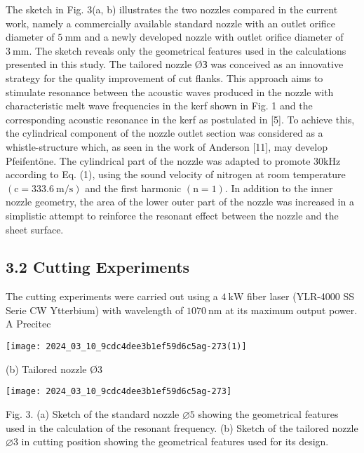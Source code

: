 \documentclass[10pt]{article}
\begin{document}
The sketch in Fig. 3(a, b) illustrates the two nozzles compared in the current work, namely a commercially available standard nozzle with an outlet orifice diameter of $5 \mathrm{~mm}$ and a newly developed nozzle with outlet orifice diameter of $3 \mathrm{~mm}$. The sketch reveals only the geometrical features used in the calculations presented in this study. The tailored nozzle ØЗ was conceived as an innovative strategy for the quality improvement of cut flanks. This approach aims to stimulate resonance between the acoustic waves produced in the nozzle with characteristic melt wave frequencies in the kerf shown in Fig. 1 and the corresponding acoustic resonance in the kerf as postulated in [5]. To achieve this, the cylindrical component of the nozzle outlet section was considered as a whistle-structure which, as seen in the work of Anderson [11], may develop Pfeifentöne. The cylindrical part of the nozzle was adapted to promote $30 \mathrm{kHz}$ according to Eq. (1), using the sound velocity of nitrogen at room temperature $(\mathrm{c}=333.6 \mathrm{~m} / \mathrm{s})$ and the first harmonic $(\mathrm{n}=1)$. In addition to the inner nozzle geometry, the area of the lower outer part of the nozzle was increased in a simplistic attempt to reinforce the resonant effect between the nozzle and the sheet surface.

\subsection*{3.2 Cutting Experiments}
The cutting experiments were carried out using a $4 \mathrm{~kW}$ fiber laser (YLR-4000 SS Serie CW Ytterbium) with wavelength of $1070 \mathrm{~nm}$ at its maximum output power. A Precitec

\begin{center}
\texttt{[image: 2024\_03\_10\_9cdc4dee3b1ef59d6c5ag-273(1)]}
\end{center}

(b) Tailored nozzle Ø3

\begin{center}
\texttt{[image: 2024\_03\_10\_9cdc4dee3b1ef59d6c5ag-273]}
\end{center}

Fig. 3. (a) Sketch of the standard nozzle $\varnothing 5$ showing the geometrical features used in the calculation of the resonant frequency. (b) Sketch of the tailored nozzle $\varnothing 3$ in cutting position showing the geometrical features used for its design.
\end{document}
